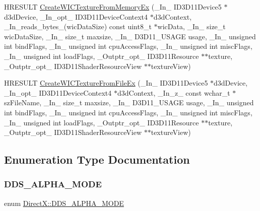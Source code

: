 \begin{DoxyCompactItemize}
\item 
H\+R\+E\+S\+U\+LT \hyperlink{namespace_direct_x_a3050c8a43d04ac188364f481ed9b0753}{Create\+W\+I\+C\+Texture\+From\+Memory\+Ex} (\+\_\+\+In\+\_\+ I\+D3\+D11\+Device5 $\ast$d3d\+Device, \+\_\+\+In\+\_\+opt\+\_\+ I\+D3\+D11\+Device\+Context4 $\ast$d3d\+Context, \+\_\+\+In\+\_\+reads\+\_\+bytes\+\_\+(wic\+Data\+Size) const uint8\+\_\+t $\ast$wic\+Data, \+\_\+\+In\+\_\+ size\+\_\+t wic\+Data\+Size, \+\_\+\+In\+\_\+ size\+\_\+t maxsize, \+\_\+\+In\+\_\+ D3\+D11\+\_\+\+U\+S\+A\+GE usage, \+\_\+\+In\+\_\+ unsigned int bind\+Flags, \+\_\+\+In\+\_\+ unsigned int cpu\+Access\+Flags, \+\_\+\+In\+\_\+ unsigned int misc\+Flags, \+\_\+\+In\+\_\+ unsigned int load\+Flags, \+\_\+\+Outptr\+\_\+opt\+\_\+ I\+D3\+D11\+Resource $\ast$$\ast$texture, \+\_\+\+Outptr\+\_\+opt\+\_\+ I\+D3\+D11\+Shader\+Resource\+View $\ast$$\ast$texture\+View)
\item 
H\+R\+E\+S\+U\+LT \hyperlink{namespace_direct_x_a345511cec87f49323fb1854ba0fb433e}{Create\+W\+I\+C\+Texture\+From\+File\+Ex} (\+\_\+\+In\+\_\+ I\+D3\+D11\+Device5 $\ast$d3d\+Device, \+\_\+\+In\+\_\+opt\+\_\+ I\+D3\+D11\+Device\+Context4 $\ast$d3d\+Context, \+\_\+\+In\+\_\+z\+\_\+ const wchar\+\_\+t $\ast$sz\+File\+Name, \+\_\+\+In\+\_\+ size\+\_\+t maxsize, \+\_\+\+In\+\_\+ D3\+D11\+\_\+\+U\+S\+A\+GE usage, \+\_\+\+In\+\_\+ unsigned int bind\+Flags, \+\_\+\+In\+\_\+ unsigned int cpu\+Access\+Flags, \+\_\+\+In\+\_\+ unsigned int misc\+Flags, \+\_\+\+In\+\_\+ unsigned int load\+Flags, \+\_\+\+Outptr\+\_\+opt\+\_\+ I\+D3\+D11\+Resource $\ast$$\ast$texture, \+\_\+\+Outptr\+\_\+opt\+\_\+ I\+D3\+D11\+Shader\+Resource\+View $\ast$$\ast$texture\+View)
\end{DoxyCompactItemize}


\subsection{Enumeration Type Documentation}
\hypertarget{namespace_direct_x_a7cb48689d75471680c0bf7f79caaaf1f}{}\label{namespace_direct_x_a7cb48689d75471680c0bf7f79caaaf1f} 
\subsubsection{\texorpdfstring{D\+D\+S\+\_\+\+A\+L\+P\+H\+A\+\_\+\+M\+O\+DE}{DDS\_ALPHA\_MODE}}
{\footnotesize\ttfamily enum \hyperlink{namespace_direct_x_a7cb48689d75471680c0bf7f79caaaf1f}{Direct\+X\+::\+D\+D\+S\+\_\+\+A\+L\+P\+H\+A\+\_\+\+M\+O\+DE}}

